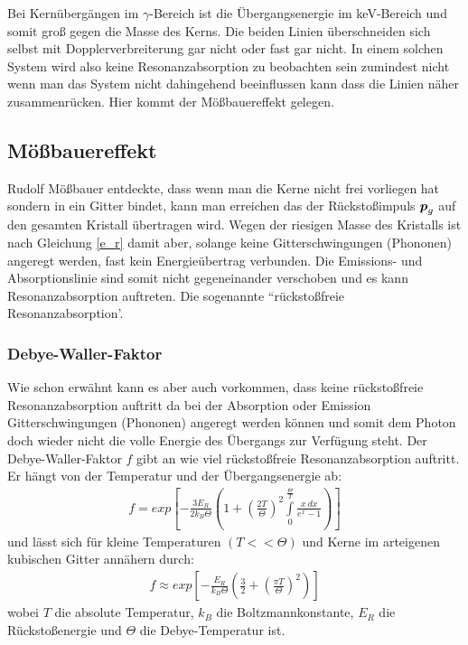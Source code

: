 \documentclass[12pt]{article}
\renewcommand*\vec[1]{{\mbox{\boldmath\ensuremath{#1}}}}
\begin{document}
Bei Kernübergängen im $\gamma$-Bereich ist die Übergangsenergie im keV-Bereich und somit groß gegen die Masse des Kerns. Die beiden Linien überschneiden sich
selbst mit Dopplerverbreiterung gar nicht oder fast gar nicht. In einem solchen System wird also keine Resonanzabsorption zu beobachten sein zumindest nicht
wenn man das System nicht dahingehend beeinflussen kann dass die Linien näher zusammenrücken. Hier kommt der Mößbauereffekt gelegen.

\subsection{Mößbauereffekt}
Rudolf Mößbauer entdeckte, dass wenn man die Kerne nicht frei vorliegen hat sondern in ein Gitter bindet, kann man erreichen das der Rückstoßimpuls $\vec{p}_g$
auf den gesamten Kristall übertragen wird. Wegen der riesigen Masse des Kristalls ist nach Gleichung \ref{e_r} damit aber, solange keine Gitterschwingungen (Phononen) angeregt werden,
fast kein Energieübertrag verbunden. Die Emissions- und Absorptionslinie sind somit nicht gegeneinander verschoben und es kann Resonanzabsorption auftreten. Die sogenannte
``rückstoßfreie Resonanzabsorption'.

\subsubsection{Debye-Waller-Faktor}
Wie schon erwähnt kann es aber auch vorkommen, dass keine rückstoßfreie Resonanzabsorption auftritt da bei der Absorption oder Emission Gitterschwingungen (Phononen) 
angeregt werden können und somit dem Photon doch wieder nicht die volle Energie des Übergangs zur Verfügung steht. Der Debye-Waller-Faktor $f$ gibt an wie viel rückstoßfreie Resonanzabsorption
auftritt. Er hängt von der Temperatur und der Übergangsenergie ab:
\begin{align}
 f = exp\left[ -\frac{3E_R}{2k_B\Theta}\left(1+\left(\frac{2T}{\Theta}\right)^2 \int\limits_{0}^{\frac{\Theta}{T}} \frac{x~dx}{e^x - 1}\right)\right]
\end{align}
und lässt sich für kleine Temperaturen $(T<<\Theta)$ und Kerne im arteigenen kubischen Gitter annähern durch:
\begin{align}
 f \approx exp \left[ -\frac{E_R}{k_B\Theta}\left(\frac{3}{2} + \left(\frac{\pi T}{\Theta}\right)^2\right)\right]
\end{align}
wobei $T$ die absolute Temperatur, $k_B$ die Boltzmannkonstante, $E_R$ die Rückstoßenergie und $\Theta$ die Debye-Temperatur ist.
\end{document}
